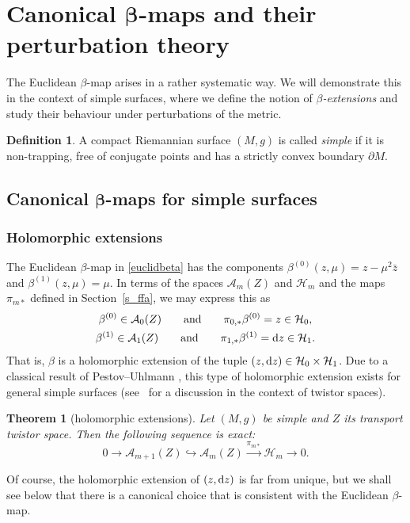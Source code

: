 \documentclass[10pt,a4paper]{amsart}
\newtheorem*{theorem*}{Theorem}
\numberwithin{equation}{section}
\theoremstyle{definition}
\newtheorem{Definition}[Theorem]{Definition}
\newcommand{\1}{{\bf 1}}
\begin{document}
\section[Canonical beta-maps and their perturbation theory]{Canonical $\boldsymbol{\beta}$-maps and their perturbation theory}\label{s_betamaps}

The Euclidean $\beta$-map arises in a rather systematic way. We will demonstrate this in the context of simple surfaces, where we define the notion of {\it $\beta$-extensions} and study their behaviour under perturbations of the metric.

\begin{Definition} \label{def_simple}A compact Riemannian surface $(M,g)$ is called {\it simple} if it is non-trapping, free of conjugate points and has a strictly convex boundary $\partial M$.
\end{Definition}



\subsection[Canonical beta-maps for simple surfaces]{Canonical $\boldsymbol{\beta}$-maps for simple surfaces}\label{s_canonicalbeta}


\subsubsection{Holomorphic extensions}\label{s_holext}
The Euclidean $\beta$-map in \eqref{euclidbeta} has the components $\beta^{(0)}(z,\mu)=z-\mu^2 \bar z$ and $\beta^{(1)}(z,\mu)=\mu$. In terms of the spaces $\mathcal A_m(Z)$ and $\mathcal H_m$ and the maps $\pi_{m*}$ defined in Section~\ref{s_ffa}, we may express this as
\begin{gather*}
	\beta^{(0)} \in \mathcal A_0(Z)\qquad \text{and} \qquad \pi_{0,*}\beta^{(0)} = z \in \mathcal H_0,\\
	\beta^{(1)} \in \mathcal A_1(Z)\qquad \text{and} \qquad \pi_{1,*}\beta^{(1)} = {\rm d}z \in \mathcal H_1.
\end{gather*}
That is, $\beta$ is a holomorphic extension of the tuple $(z,{\rm d}z)\in \mathcal H_0\times \mathcal H_1$. Due to a classical result of Pestov--Uhlmann \cite{PeUh05}, this type of holomorphic extension exists for general simple surfaces (see~\cite{BLP24,BoPa23} for a discussion in the context of twistor spaces).

\begin{theorem*}[holomorphic extensions]
Let $(M,g)$ be simple and $Z$ its transport twistor space. Then the following sequence is exact:
\[
	0\rightarrow \mathcal A_{m+1}(Z)\hookrightarrow \mathcal A_m(Z) \xrightarrow{\pi_{m*}} \mathcal H_m\rightarrow 0.
\]	
\end{theorem*}
Of course, the holomorphic extension of $(z,{\rm d}z)$ is far from unique, but we shall see below that there is a canonical choice that is consistent with the Euclidean $\beta$-map.
\end{document}
